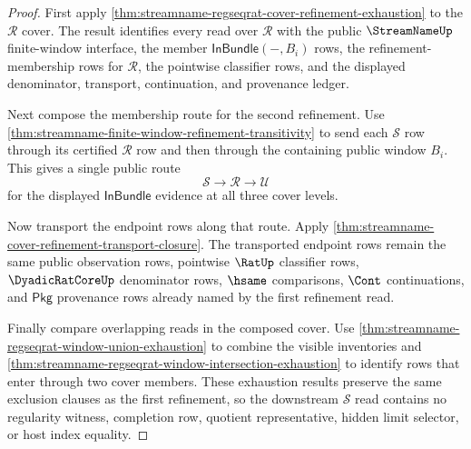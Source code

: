 \begin{proof}
First apply
\autoref{thm:streamname-regseqrat-cover-refinement-exhaustion} to the
$\mathcal{R}$ cover. The result identifies every read over $\mathcal{R}$ with
the public $\StreamNameUp$ finite-window interface, the member
$\mathsf{InBundle}(-,B_i)$ rows, the refinement-membership rows for
$\mathcal{R}$, the pointwise classifier rows, and the displayed denominator,
transport, continuation, and provenance ledger.

Next compose the membership route for the second refinement. Use
\autoref{thm:streamname-finite-window-refinement-transitivity} to send each
$\mathcal{S}$ row through its certified $\mathcal{R}$ row and then through the
containing public window $B_i$. This gives a single public route
$$
\mathcal{S}\to\mathcal{R}\to\mathcal{U}
$$
for the displayed $\mathsf{InBundle}$ evidence at all three cover levels.

Now transport the endpoint rows along that route. Apply
\autoref{thm:streamname-cover-refinement-transport-closure}. The transported
endpoint rows remain the same public observation rows, pointwise $\RatUp$
classifier rows, $\DyadicRatCoreUp$ denominator rows, $\hsame$ comparisons,
$\Cont$ continuations, and $\mathsf{Pkg}$ provenance rows already named by the
first refinement read.

Finally compare overlapping reads in the composed cover. Use
\autoref{thm:streamname-regseqrat-window-union-exhaustion} to combine the
visible inventories and
\autoref{thm:streamname-regseqrat-window-intersection-exhaustion} to identify
rows that enter through two cover members. These exhaustion results preserve
the same exclusion clauses as the first refinement, so the downstream
$\mathcal{S}$ read contains no regularity witness, completion row, quotient
representative, hidden limit selector, or host index equality.
\end{proof}
